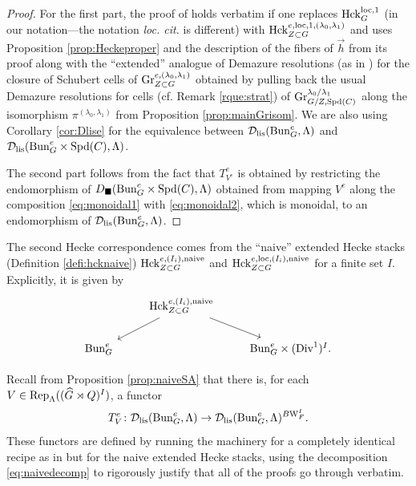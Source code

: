 \begin{proof}
    For the first part, the proof of \cite[Proposition IX.2.1]{Geometrization} holds verbatim if one replaces $\mathrm{Hck}_{G}^{\mathrm{loc},1}$ (in our notation---the notation \emph{loc. cit.} is different) with $\mathrm{Hck}_{Z \subset G}^{e,\mathrm{loc},1,(\lambda_{0},\lambda_{1})}$ and uses Proposition \ref{prop:Heckeproper} and the description of the fibers of $\overrightarrow{h}$ from its proof along with the ``extended'' analogue of Demazure resolutions (as in \cite[\S VI.5]{Geometrization}) for the closure of Schubert cells of $\textnormal{Gr}^{e,(\lambda_{0},\lambda_{1})}_{Z \subset G}$ obtained by pulling back the usual Demazure resolutions for cells (cf. Remark \ref{rque:strat}) of $\textnormal{Gr}^{\lambda_{0}/\lambda_{1}}_{G/Z,\mathrm{Spd}(C)}$ along the isomorphism $\pi^{(\lambda_{0},\lambda_{1})}$ from Proposition \ref{prop:mainGrisom}. We are also using Corollary \ref{cor:Dlise} for the equivalence between $\mathcal{D}_{\textnormal{lis}}(\mathrm{Bun}_{G}^{e},\Lambda)$ and $\mathcal{D}_{\textnormal{lis}}(\mathrm{Bun}_{G}^{e} \times \mathrm{Spd}(C),\Lambda)$.

    The second part follows from the fact that $T^{e}_{V^{e}}$ is  obtained by restricting the endomorphism of $D_{\blacksquare}(\mathrm{Bun}_{G}^{e} \times \mathrm{Spd}(C),\Lambda)$ obtained from mapping $V^{e}$ along the composition \eqref{eq:monoidal1} with \eqref{eq:monoidal2}, which is monoidal, to an endomorphism of $\mathcal{D}_{\textnormal{lis}}(\mathrm{Bun}_{G}^{e},\Lambda)$.
\end{proof}

The second Hecke correspondence comes from the ``naive'' extended Hecke stacks (Definition \ref{defi:hcknaive}) $\mathrm{Hck}_{Z \subset G}^{e,(I_{i}),\textnormal{naive}}$ and $\mathrm{Hck}_{Z \subset G}^{e,\mathrm{loc},(I_{i}),\textnormal{naive}}$ for a finite set $I$. Explicitly, it is given by 
\[
\begin{tikzcd}
  &  \Hck_{Z \subset G}^{e,(I_{i}),\tn{naive}} \arrow{ld} \arrow{rd} & \\
  \Bun_{G}^{e} & & \Bun_{G}^{e} \times (\Div^{1})^{I}.
\end{tikzcd}
\]

Recall from Proposition \ref{prop:naiveSA} that there is, for each $V \in \textnormal{Rep}_{\Lambda}((\widehat{G} \rtimes Q)^{I})$, a functor
\begin{equation*}
T^{e}_{V} \colon  \mathcal{D}_{\textnormal{lis}}(\mathrm{Bun}_{G}^{e},\Lambda) \to \mathcal{D}_{\textnormal{lis}}(\mathrm{Bun}_{G}^{e},\Lambda)^{B\mathrm{W}_{F}^{I}}.
\end{equation*}
These functors are defined by running the \cite{Geometrization} machinery for  a completely identical recipe as in \cite{Geometrization} but for the naive extended Hecke stacks, using the decomposition \eqref{eq:naivedecomp} to rigorously justify that all of the proofs go through verbatim.

